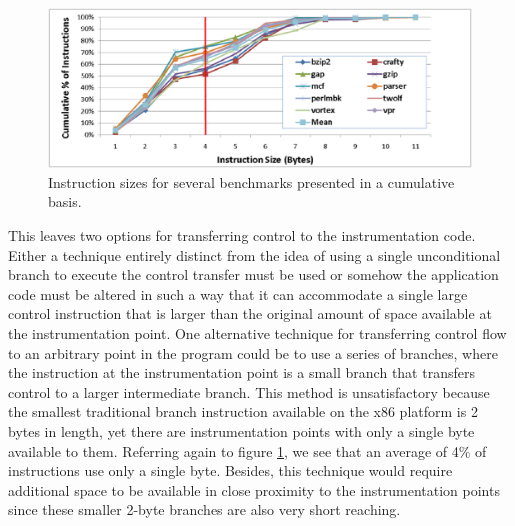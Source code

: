 \begin{figure}[ht]
\centering
\label{Figure:InstructionSizes}
\includegraphics[scale=0.5]{instsize.eps}
\caption{Instruction sizes for several benchmarks presented in a cumulative basis.}
\end{figure}

This leaves two options for transferring control to the instrumentation code.
Either a technique entirely distinct from the idea of using a single
unconditional branch to execute the control transfer must be used or somehow the application code must be altered
in such a way that it can accommodate a single large control instruction that is larger than
the original amount of space available at the instrumentation point. One alternative
technique for transferring control flow to an arbitrary point in the program could be to use a series of branches,
where the instruction at the instrumentation point is a small branch that
transfers control to a larger intermediate branch. This
method is unsatisfactory because the smallest traditional branch instruction available
on the x86 platform is 2 bytes in length, yet there are
instrumentation points with only a single byte available to them. Referring again to figure \ref{Figure:InstructionSizes}, we see
that an average of 4\% of instructions use only a single byte.
Besides, this technique would require additional space to be available in close proximity to the instrumentation points since these
smaller 2-byte branches are also very short reaching. 

